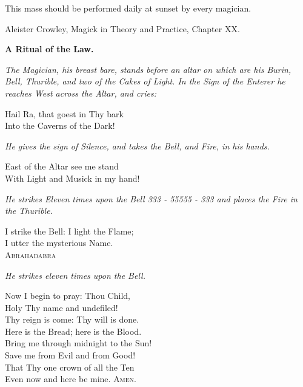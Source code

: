 
\epigraph{This mass should be performed daily at sunset by every magician.}{Aleister Crowley, Magick in Theory and Practice, Chapter XX.}

\textbf{A Ritual of the Law.}

\textit{The Magician, his breast bare, stands before an altar on which are his Burin, Bell, Thurible, and two of the Cakes of Light. In the Sign of the Enterer he reaches West across the Altar, and cries:}

\begin{quoting}[indentfirst=false]
Hail Ra, that goest in Thy bark \\
Into the Caverns of the Dark!
\end{quoting}

\textit{He gives the sign of Silence, and takes the Bell, and Fire, in his hands.}

\begin{quoting}[indentfirst=false]
East of the Altar see me stand \\
With Light and Musick in my hand!
\end{quoting}

\textit{He strikes Eleven times upon the Bell 333 - 55555 - 333 and places the Fire in the Thurible.}

\begin{quoting}[indentfirst=false]
I strike the Bell: I light the Flame; \\
I utter the mysterious Name. \\
\textsc{Abrahadabra}
\end{quoting}

\textit{He strikes eleven times upon the Bell.}

\begin{quoting}[indentfirst=false]
Now I begin to pray: Thou Child, \\
Holy Thy name and undefiled! \\
Thy reign is come: Thy will is done. \\
Here is the Bread; here is the Blood. \\
Bring me through midnight to the Sun! \\
Save me from Evil and from Good! \\
That Thy one crown of all the Ten \\
Even now and here be mine. \textsc{Amen}.
\end{quoting}

